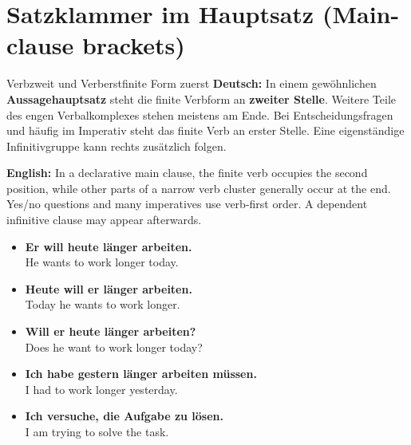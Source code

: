 \documentclass[a4paper,11pt]{article}
\newcommand{\GermanText}[1]{\textbf{Deutsch: }#1\par}
\newcommand{\EnglishText}[1]{{\small\color{SoftGray}\textbf{English: }#1\par}}
\newcommand{\ExampleItem}[2]{\item \textbf{#1}\\{\small\color{SoftGray}#2}}
\newcommand{\DEEN}[2]{\GermanText{#1}\EnglishText{#2}}
\newcommand{\Pair}[2]{\ExampleItem{#1}{#2}}
\begin{document}
\section{Satzklammer im Hauptsatz \textnormal{(Main-clause brackets)}}
\begin{grammarentry}{Verbzweit und Verberst}{finite Form zuerst}
\DEEN{In einem gewöhnlichen \textbf{Aussagehauptsatz} steht die finite Verbform an \textbf{zweiter Stelle}. Weitere Teile des engen Verbalkomplexes stehen meistens am Ende. Bei Entscheidungsfragen und häufig im Imperativ steht das finite Verb an erster Stelle. Eine eigenständige Infinitivgruppe kann rechts zusätzlich folgen.}{In a declarative main clause, the finite verb occupies the second position, while other parts of a narrow verb cluster generally occur at the end. Yes/no questions and many imperatives use verb-first order. A dependent infinitive clause may appear afterwards.}
\end{grammarentry}
\begin{exbox}\begin{itemize}
\Pair{Er will heute länger arbeiten.}{He wants to work longer today.}
\Pair{Heute will er länger arbeiten.}{Today he wants to work longer.}
\Pair{Will er heute länger arbeiten?}{Does he want to work longer today?}
\Pair{Ich habe gestern länger arbeiten müssen.}{I had to work longer yesterday.}
\Pair{Ich versuche, die Aufgabe zu lösen.}{I am trying to solve the task.}
\end{itemize}\end{exbox}
\end{document}
